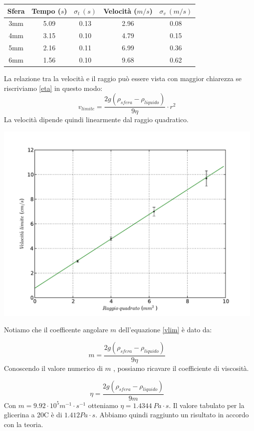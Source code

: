 \begin{center}
\begin{tabular}{c|c|c|c|c}
Sfera & Tempo ($s$) & $\sigma_t\ (s) $ & Velocità ($m/s$) & $\sigma_v \ (m/s) $\\
\midrule
3mm & 5.09 & 0.13 & 2.96 & 0.08\\
4mm & 3.15 & 0.10 & 4.79 & 0.15\\
5mm & 2.16 & 0.11 & 6.99 & 0.36\\
6mm & 1.56 & 0.10 & 9.68 & 0.62\\
\end{tabular}
\end{center}
La relazione tra la velocità e il raggio può essere vista con maggior chiarezza se riscriviamo \ref{eta}  in questo modo: 
\begin{equation}\label{vlim}
v_{limite}=  \frac{2g(\rho_{sfera} - \rho_{liquido})}{9 \eta} \cdot r^2
\end{equation}
La velocità dipende quindi linearmente dal raggio quadratico.
\begin{center}
\includegraphics[scale=0.75]{../grafici/velocita}
\end{center}


Notiamo che il coefficente angolare $m$ dell'equazione \ref{vlim} è dato da:

\begin{equation}
m= \frac{2g(\rho_{sfera} - \rho_{liquido})}{9 \eta}
\end{equation}
Conoscendo il valore numerico di $m$ , possiamo ricavare il coefficiente di viscosità.

\begin{equation}
\eta = \frac{2g(\rho_{sfera} - \rho_{liquido})}{9 m}
\end{equation}
Con $m = 9.92 \cdot 10^{5} m^{-1}\cdot s^{-1}$ otteniamo  $\eta = 1.4344 \ Pa \cdot s$.
Il valore tabulato per la glicerina a 20C  è di $1.412 Pa \cdot s$. Abbiamo quindi raggiunto un risultato in accordo con la teoria. 

